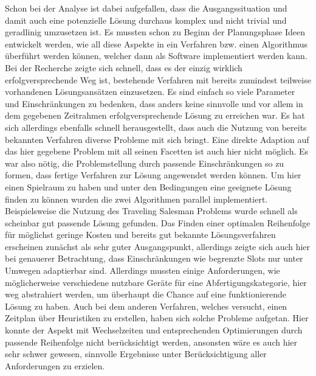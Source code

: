Schon bei der Analyse ist dabei aufgefallen, dass die Ausgangssituation und damit auch eine potenzielle Lösung durchaus komplex und nicht trivial und geradlinig umzusetzen ist. Es mussten schon zu Beginn der Planungsphase Ideen entwickelt werden, wie all diese Aspekte in ein Verfahren bzw. einen Algorithmus überführt werden können, welcher dann als Software implementiert werden kann. Bei der Recherche zeigte sich schnell, dass es der einzig wirklich erfolgversprechende Weg ist, bestehende Verfahren mit bereits zumindest teilweise vorhandenen Lösungsansätzen einzusetzen. Es sind einfach so viele Parameter und Einschränkungen zu bedenken, dass anders keine sinnvolle und vor allem in dem gegebenen Zeitrahmen erfolgversprechende Lösung zu erreichen war. Es hat sich allerdings ebenfalls schnell herausgestellt, dass auch die Nutzung von bereits bekannten Verfahren diverse Probleme mit sich bringt. Eine direkte Adaption auf das hier gegebene Problem mit all seinen Facetten ist auch hier nicht möglich. Es war also nötig, die Problemstellung durch passende Einschränkungen so zu formen, dass fertige Verfahren zur Lösung angewendet werden können. Um hier einen Spielraum zu haben und unter den Bedingungen eine geeignete Lösung finden zu können wurden die zwei Algorithmen parallel implementiert. Beispielsweise die Nutzung des Traveling Salesman Problems wurde schnell als scheinbar gut passende Lösung gefunden. Das Finden einer optimalen Reihenfolge für möglichst geringe Kosten und bereits gut bekannte Lösungsverfahren erscheinen zunächst als sehr guter Ausgangspunkt, allerdings zeigte sich auch hier bei genauerer Betrachtung, dass Einschränkungen wie begrenzte Slots nur unter Umwegen adaptierbar sind. Allerdings mussten einige Anforderungen, wie möglicherweise verschiedene nutzbare Geräte für eine Abfertigungskategorie, hier weg abstrahiert werden, um überhaupt die Chance auf eine funktionierende Lösung zu haben. Auch bei dem anderen Verfahren, welches versucht, einen Zeitplan über Heuristiken zu erstellen, haben sich solche Probleme aufgetan. Hier konnte der Aspekt mit Wechselzeiten und entsprechenden Optimierungen durch passende Reihenfolge nicht berücksichtigt werden, ansonsten wäre es auch hier sehr schwer gewesen, sinnvolle Ergebnisse unter Berücksichtigung aller Anforderungen zu erzielen.

